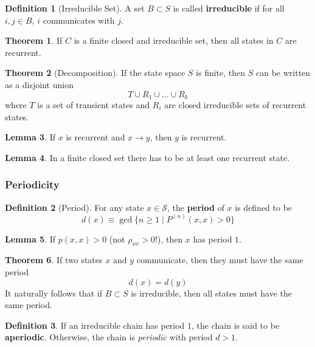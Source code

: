 \documentclass{article}
\theoremstyle{definition}
\newtheorem{theorem}{Theorem}[section]
\newtheorem{lemma}[theorem]{Lemma}
\theoremstyle{remark}
\theoremstyle{definition}
\newtheorem{definition}{Definition}[section]
\begin{document}
\begin{definition}[Irreducible Set]
A set $B \subset S$ is called \textbf{irreducible} if for all $i, j \in B$, $i$ communicates with $j$. 
\end{definition}

\begin{theorem}
If $C$ is a finite closed and irreducible set, then all states in $C$ are recurrent. 
\end{theorem}

\begin{theorem}[Decomposition]
If the state space $S$ is finite, then $S$ can be written as a disjoint union 
\[T \cup R_1 \cup \ldots \cup R_k\]
where $T$ is a set of transient states and $R_i$ are closed irreducible sets of recurrent states. 
\end{theorem}

\begin{lemma}
If $x$ is recurrent and $x \rightarrow y$, then $y$ is recurrent. 
\end{lemma}

\begin{lemma}
In a finite closed set there has to be at least one recurrent state. 
\end{lemma}

\subsubsection{Periodicity}

\begin{definition}[Period]
For any state $x \in \mathcal{S}$, the \textbf{period} of $x$ is defined to be
\[d(x) \equiv \gcd \{n \geq 1 \; | \; P^{(n)} (x, x) > 0\}\]
\end{definition}

\begin{lemma}
If $p(x, x) > 0$ (not $\rho_{xx} > 0$!), then $x$ has period $1$. 
\end{lemma}

\begin{theorem}
If two states $x$ and $y$ communicate, then they must have the same period
\[d(x) = d(y)\]
It naturally follows that if $B \subset S$ is irreducible, then all states must have the same period. 
\end{theorem}

\begin{definition}
If an irreducible chain has period $1$, the chain is said to be \textbf{aperiodic}. Otherwise, the chain is \textit{periodic} with period $d > 1$. 
\end{definition}
\end{document}
